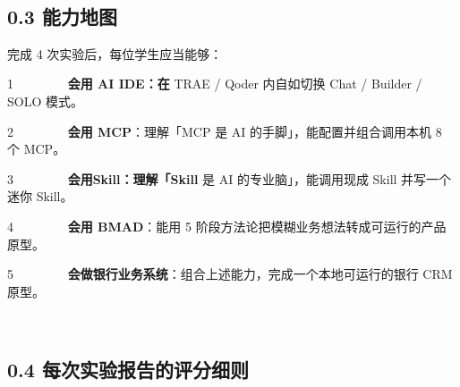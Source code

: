 \documentclass[
  american,
  chinese,
]{ctexart}
\begin{document}
\foreignlanguage{american}{}

~

\subsection{\texorpdfstring{\foreignlanguage{american}{0.3 }{\foreignlanguage{american}{能力地图}}}{0.3 能力地图}}\label{ux80fdux529bux5730ux56fe}

{完成}\foreignlanguage{american}{ 4 }{次实验后，每位学生应当能够：}\foreignlanguage{american}{}

\foreignlanguage{american}{{1{~~~~~~~~
}}}{\textbf{\foreignlanguage{american}{会用}}}\textbf{\foreignlanguage{american}{ AI {IDE{：在}}}}\foreignlanguage{american}{ TRAE / {Qoder} }{\foreignlanguage{american}{内自如切换}}\foreignlanguage{american}{ Chat / Builder / SOLO }{\foreignlanguage{american}{模式}}\foreignlanguage{american}{。}

\foreignlanguage{american}{{2{~~~~~~~~
}}}\textbf{{会用}\foreignlanguage{american}{ MCP}}{：理解「}\foreignlanguage{american}{MCP }{是}\foreignlanguage{american}{ AI }{的手脚」，能配置并组合调用本机}\foreignlanguage{american}{ 8 }{{个}}\foreignlanguage{american}{ MCP}{。}\foreignlanguage{american}{}

\foreignlanguage{american}{{3{~~~~~~~~
}}}{\textbf{\foreignlanguage{american}{会用}}}\textbf{\foreignlanguage{american}{ {Skill{：理解「}{Skill}}}}\foreignlanguage{american}{ }\foreignlanguage{american}{是}\foreignlanguage{american}{ AI }{\foreignlanguage{american}{的专业脑}}\foreignlanguage{american}{」，{能调用现成}}\foreignlanguage{american}{ Skill }{\foreignlanguage{american}{并写一个迷你}}\foreignlanguage{american}{ Skill}\foreignlanguage{american}{。}

\foreignlanguage{american}{{4{~~~~~~~~
}}}\textbf{{会用}\foreignlanguage{american}{ BMAD}}{：能用}\foreignlanguage{american}{ 5 }{阶段方法论把{模糊业务}想法转成可运行的产品原型。}\foreignlanguage{american}{}

\foreignlanguage{american}{{5{~~~~~~~~
}}}\textbf{{会做银行业务系统}}{：组合上述能力，完成一个{本地可}运行的银行}\foreignlanguage{american}{ CRM }{原型。}\foreignlanguage{american}{}

\foreignlanguage{american}{}

~

\subsection{\texorpdfstring{\foreignlanguage{american}{0.4 }{每次实验报告的评分细则}\foreignlanguage{american}{}}{0.4 每次实验报告的评分细则}}\label{ux6bcfux6b21ux5b9eux9a8cux62a5ux544aux7684ux8bc4ux5206ux7ec6ux5219}
\end{document}
